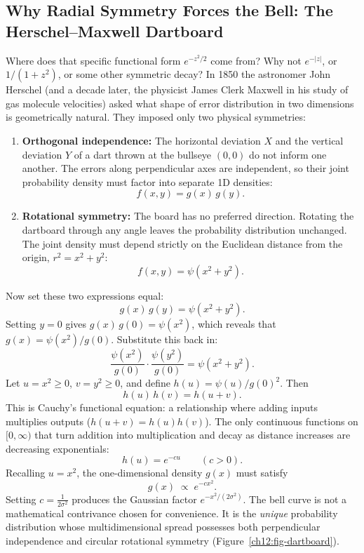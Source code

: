 \subsection{Why Radial Symmetry Forces the Bell: The Herschel--Maxwell Dartboard}
\label{ch12:dartboard}

Where does that specific functional form $e^{-z^2/2}$ come from? Why not $e^{-|z|}$, or $1/(1+z^2)$, or some other symmetric decay?
In 1850 the astronomer John Herschel (and a decade later, the physicist James Clerk Maxwell in his study of gas molecule velocities) asked what shape of error distribution in two dimensions is geometrically natural. They imposed only two physical symmetries:

\begin{enumerate}
  \item \textbf{Orthogonal independence:} The horizontal deviation $X$ and the vertical deviation $Y$ of a dart thrown at the bullseye $(0,0)$ do not inform one another. The errors along perpendicular axes are independent, so their joint probability density must factor into separate 1D densities:
  \[
    f(x,y) = g(x)\,g(y).
  \]
  \item \textbf{Rotational symmetry:} The board has no preferred direction. Rotating the dartboard through any angle leaves the probability distribution unchanged. The joint density must depend strictly on the Euclidean distance from the origin, $r^2 = x^2 + y^2$:
  \[
    f(x,y) = \psi(x^2 + y^2).
  \]
\end{enumerate}

Now set these two expressions equal:
\[
  g(x)\,g(y) = \psi(x^2 + y^2).
\]
Setting $y=0$ gives $g(x)\,g(0) = \psi(x^2)$, which reveals that $g(x) = \psi(x^2)/g(0)$.
Substitute this back in:
\[
  \frac{\psi(x^2)}{g(0)} \cdot \frac{\psi(y^2)}{g(0)} = \psi(x^2 + y^2).
\]
Let $u = x^2 \ge 0$, $v = y^2 \ge 0$, and define $h(u) = \psi(u)/g(0)^2$. Then
\[
  h(u)\,h(v) = h(u+v).
\]
This is Cauchy's functional equation: a relationship where adding inputs
multiplies outputs ($h(u+v) = h(u)h(v)$). The only continuous functions on
$[0,\infty)$ that turn addition into multiplication and decay as distance
increases are decreasing exponentials:
\[
  h(u) = e^{-c u} \qquad (c > 0).
\]
Recalling $u = x^2$, the one-dimensional density $g(x)$ must satisfy
\[
  g(x) \;\propto\; e^{-c x^2}.
\]
Setting $c = \frac{1}{2\sigma^2}$ produces the Gaussian factor $e^{-x^2/(2\sigma^2)}$.
The bell curve is not a mathematical contrivance chosen for convenience. It is the \emph{unique} probability distribution whose multidimensional spread possesses both perpendicular independence and circular rotational symmetry (Figure~\ref{ch12:fig-dartboard}).

